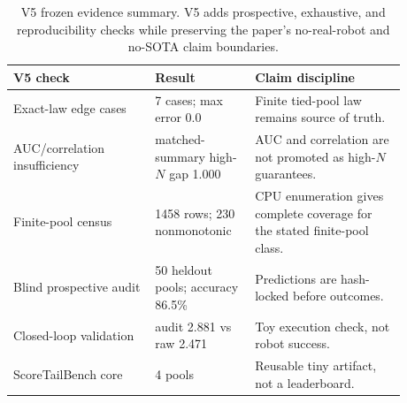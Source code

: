 \begin{table}[t]
\centering
\small
\begin{tabular}{p{0.32\linewidth}p{0.22\linewidth}p{0.34\linewidth}}
\toprule
V5 check & Result & Claim discipline \\
\midrule
Exact-law edge cases & 7 cases; max error 0.0 & Finite tied-pool law remains source of truth. \\
AUC/correlation insufficiency & matched-summary high-$N$ gap 1.000 & AUC and correlation are not promoted as high-$N$ guarantees. \\
Finite-pool census & 1458 rows; 230 nonmonotonic & CPU enumeration gives complete coverage for the stated finite-pool class. \\
Blind prospective audit & 50 heldout pools; accuracy 86.5\% & Predictions are hash-locked before outcomes. \\
Closed-loop validation & audit 2.881 vs raw 2.471 & Toy execution check, not robot success. \\
ScoreTailBench core & 4 pools & Reusable tiny artifact, not a leaderboard. \\
\bottomrule
\end{tabular}
\caption{V5 frozen evidence summary. V5 adds prospective, exhaustive, and reproducibility checks while preserving the paper's no-real-robot and no-SOTA claim boundaries.}
\label{tab:v5-summary}
\end{table}
